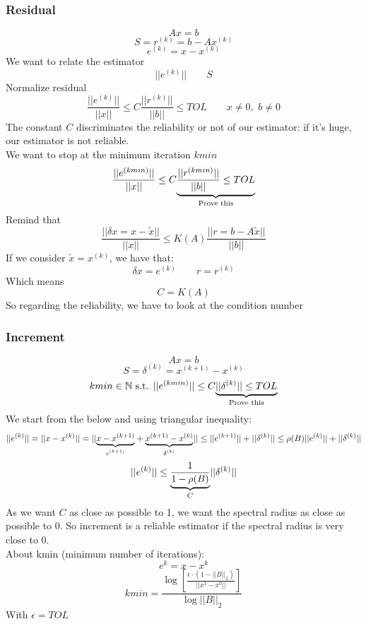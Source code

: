     \subsubsection{Residual}
    $$
    Ax=b
    $$
    $$
    S=r^{(k)}=b-Ax^{(k)}
    $$
    $$
    e^{(k)}=x-x^{(k)}
    $$
    We want to relate the estimator
    $$
    ||e^{(k)}||\qquad S
    $$
    Normalize residual
    $$
    \frac{
        ||e^{(k)}||
    }{
        ||x||
    }
    \leq
    C
    \frac{
        ||r^{(k)}||
    }{
        ||b||
    }
    \leq
    TOL\qquad
    x\neq 0,\,\,b\neq 0
    $$
    The constant $C$ discriminates the reliability or not of our estimator: if it's huge, our estimator is not reliable.\\
    We want to stop at the minimum iteration $kmin$
    $$
    \frac{
        ||e^{(kmin)}||
    }{
        ||x||
    }
    \leq
    C
    \underlabel{
        \frac{
            ||r^{(kmin)}||
        }{
            ||b||
        }
        \leq
        TOL
    }{
        Prove this
    }
    $$
    Remind that
    $$
    \frac{
        ||\delta x=x-\tilde{x}||
    }{
        ||x||
    }
    \leq
    K(A)
    \frac{
        ||r=b-A\tilde{x}||
    }{
        ||b||
    }
    $$
    If we consider $\tilde{x}=x^{(k)}$, we have that:
    $$
    \delta x = e^{(k)}\qquad r = r^{(k)}
    $$
    Which means
    $$
    C=K(A)
    $$
    So regarding the reliability, we have to look at the condition number

    \subsubsection{Increment}
    $$
    Ax=b
    $$
    $$
    S=\delta^{(k)}=x^{(k+1)}-x^{(k)}
    $$
    $$
    kmin\in\mathbb{N}\text{ s.t. }
    ||e^{(kmin)}||\leq C
    \underlabel{
        ||\delta^{(k)}||\leq TOL
    }{Prove this}
    $$
    We start from the below and using triangular inequality:
    $$
    ||e^{(k)}||=||x-x^{(k)}||=
    ||
    \underlabel{
        x-x^{(k+1)}
    }{$e^{(k+1)}$}
    +
    \underlabel{
        x^{(k+1)}-x^{(k)}
    }{$\delta^{(k)}$}
    ||
    \leq
    ||e^{(k+1)}||+||\delta^{(k)}||
    \leq
    \rho(B)||e^{(k)}||+||\delta^{(k)}||
    $$
    $$
    ||e^{(k)}||
    \leq
    \underlabel{
        \frac{
            1
        }{1-\rho(B)}
    }{$C$}
    ||\delta^{(k)}||
    $$
    As we want $C$ as close as possible to 1, we want the spectral radius as close as possible to 0. So increment is a reliable estimator if the spectral radius is very close to 0.\\
    About kmin (minimum number of iterations):
    $$
    e^k=x-x^k
    $$
    $$
    kmin = \frac{
        \log\left[
            \frac{
                \epsilon\cdot(1-||B||_2)
            }{
                ||x^1-x^0||
            }
        \right]
    }{
        \log||B||_2
    }
    $$
    With $\epsilon=TOL$